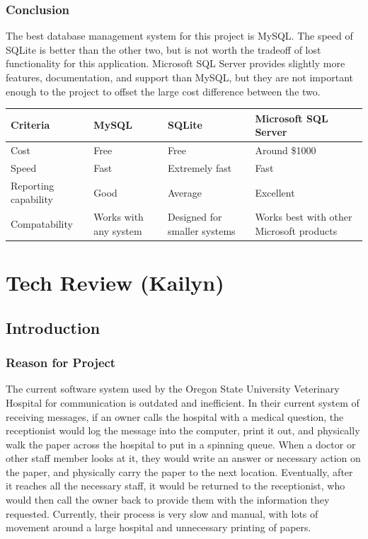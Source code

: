 \documentclass[onecolumn, draftclsnofoot,10pt, compsoc]{IEEEtran}
\begin{document}
\subsubsection{Conclusion}
The best database management system for this project is MySQL. The speed of SQLite is better than the other two, but is not worth the tradeoff of lost functionality for this application. Microsoft SQL Server provides slightly more features, documentation, and support than MySQL, but they are not important enough to the project to offset the large cost difference between the two.

\begin{table}[h!]
\centering
\begin{tabular}{ |l|l|l|l| } 
\hline
\textbf{Criteria} & \textbf{MySQL} & \textbf{SQLite} & \textbf{Microsoft SQL Server} \\ \hline
Cost & Free & Free & Around \$1000 \\ \hline
Speed & Fast & Extremely fast & Fast \\ \hline
Reporting capability & Good & Average & Excellent \\ \hline
Compatability & Works with any system & Designed for smaller systems & Works best with other Microsoft products \\ \hline
\end{tabular}
\end{table}

\newpage
\section{Tech Review (Kailyn)}

\subsection{Introduction}

\subsubsection{Reason for Project}
The current software system used by the Oregon State University Veterinary Hospital for communication is outdated and inefficient. In their current system of receiving messages, if an owner calls the hospital with a medical question, the receptionist would log the message into the computer, print it out, and physically walk the paper across the hospital to put in a spinning queue. When a doctor or other staff member looks at it, they would write an answer or necessary action on the paper, and physically carry the paper to the next location. Eventually, after it reaches all the necessary staff, it would be returned to the receptionist, who would then call the owner back to provide them with the information they requested. Currently, their process is very slow and manual, with lots of movement around a large hospital and unnecessary printing of papers.
\end{document}
